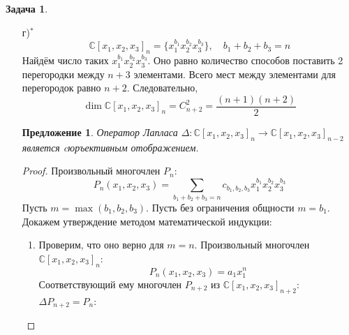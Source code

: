 \documentclass[12pt]{article}
\newtheorem{predl}[theorem]{Предложение}
\theoremstyle{definition}
\newtheorem{zad}{Задача}[section]
\begin{document}
\begin{zad}
\begin{itemize}
\begin{proof}
        Условие справа означает бесследовость тензора $t_{i_1,...,i_n}$. Тензор $t_{i_1,...,i_n}$ симметричен, поскольку в $P$ от перемены мест множителей произведение не меняется. Отображение между пространством симметричных бесследовых тензоров в $S^n\mathbb{C}^3$ и пространством гармонических полиномов степени $n$ взаимно-однозначно, поскольку по коэффициентам $t_{i_1,...i_n}$ многочлен восстанавливается единственным образом. И наоборот, по многочлену легко выписать тензор $t_{i_1,...,i_n}$. Таким образом, показан изоморфизм между пространством симметричных бесследовых тензоров в $S^n\mathbb{C}^3$ и пространством гармонических полиномов степени $n$.
    \end{proof}
    \item[г)$^*$]
    \begin{equation}
        \mathbb{C}[x_1,x_2,x_3]_n=\{x_1^{b_1}x_2^{b_2}x_3^{b_3}\},\quad b_1+b_2+b_3=n
    \end{equation}
    Найдём число таких $x_1^{b_1}x_2^{b_2}x_3^{b_3}$. Оно равно количество способов поставить 2 перегородки между $n+3$ элементами. Всего мест между элементами для перегородок равно $n+2$. Следовательно,
    \begin{equation}
        \boxed{\dim \mathbb{C}[x_1,x_2,x_3]_n=C_{n+2}^2=\frac{(n+1)(n+2)}{2}}
    \end{equation}
    \begin{predl}
    Оператор Лапласа $\Delta:\mathbb{C}[x_1,x_2,x_3]_n\rightarrow\mathbb{C}[x_1,x_2,x_3]_{n-2}$ является cюръективным отображением.
    \end{predl}
    \begin{proof}
        Произвольный многочлен $P_n$:
        \begin{equation}
            P_n(x_1,x_2,x_3)=\sum\limits_{b_1+b_2+b_3=n}c_{b_1,b_2,b_3}x_1^{b_1}x_2^{b_2}x_3^{b_3}
        \end{equation}
        Пусть $m=\max(b_1,b_2,b_3)$. Пусть без ограничения общности $m=b_1$. Докажем утверждение методом математической индукции:
        \begin{enumerate}
            \item Проверим, что оно верно для $m=n$. Произвольный многочлен $\mathbb{C}[x_1,x_2,x_3]_n$:
            \begin{equation}
                P_n(x_1,x_2,x_3)=a_1x_1^n
            \end{equation}
            Соответствующий ему многочлен $P_{n+2}$ из $\mathbb{C}[x_1,x_2,x_3]_{n+2}$: $\Delta P_{n+2}=P_n$:
            \begin{equation}

\end{equation}
\end{enumerate}
\end{proof}
\end{itemize}
\end{zad}
\end{document}
